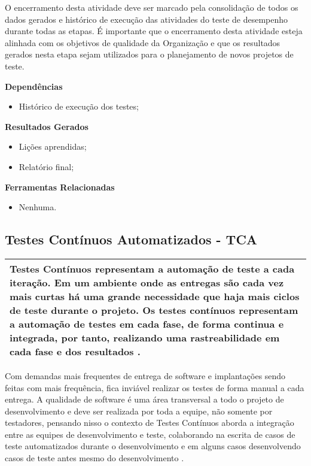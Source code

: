 O encerramento desta atividade deve ser marcado pela consolidação de todos os dados gerados e histórico de execução das atividades do teste de desempenho durante todas as etapas. É importante que o encerramento desta atividade esteja alinhada com os objetivos de qualidade da Organização e que os resultados gerados nesta etapa sejam utilizados para o planejamento de novos projetos de teste.

\textbf{Dependências}
\begin{itemize}
    \item Histórico de execução dos testes;
\end{itemize}

\textbf{Resultados Gerados}
\begin{itemize}
    \item Lições aprendidas;
    \item Relatório final;
\end{itemize}

\textbf{Ferramentas Relacionadas}
\begin{itemize}
    \item Nenhuma.
\end{itemize}


\subsection{Testes Contínuos Automatizados - TCA}
\label{sec:tca}

\begin{table}[H]
\centering
\begin{tabular}{|p{130mm}|}
\hline
Testes Contínuos representam a automação de teste a cada iteração. Em um ambiente onde as entregas são cada vez mais curtas há uma grande necessidade que haja mais ciclos de teste durante o projeto. Os testes contínuos representam a automação de testes em cada fase, de forma continua e integrada, por tanto, realizando uma rastreabilidade em cada fase e dos resultados \cite{humble2010}. \\
\hline
\end{tabular}
\end{table}

Com demandas mais frequentes de entrega de software e implantações sendo feitas com mais frequência, fica inviável realizar os testes de forma manual a cada entrega. A qualidade de software é uma área transversal a todo o projeto de desenvolvimento e deve ser realizada por toda a equipe, não somente por testadores, pensando nisso o contexto de Testes Contínuos aborda a integração entre as equipes de desenvolvimento e teste, colaborando na escrita de casos de teste automatizados durante o desenvolvimento e em alguns casos desenvolvendo casos de teste antes mesmo do desenvolvimento \cite{humble2010}.

